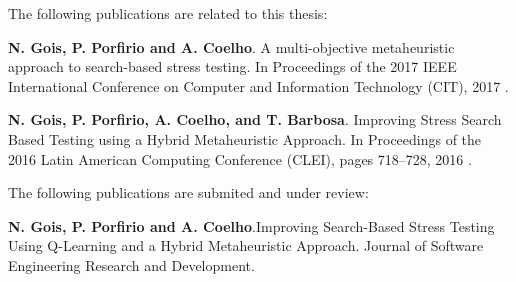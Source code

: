  

The following publications are related to this thesis:

\noindent \textbf{N. Gois, P. Porfirio and A. Coelho}. A multi-objective metaheuristic approach to search-based stress testing. In Proceedings of the 2017 IEEE International Conference on Computer and Information Technology (CIT), 2017 \cite{Gois2017}.

\noindent \textbf{N. Gois, P. Porfirio, A. Coelho, and T. Barbosa}. Improving Stress Search Based Testing using a Hybrid Metaheuristic Approach. In Proceedings of the 2016 Latin American Computing Conference (CLEI), pages 718–728, 2016 \cite{Gois2016}.


The following publications are submited and under review:

\noindent \textbf{N. Gois, P. Porfirio and A. Coelho}.Improving Search-Based Stress Testing Using Q-Learning and a Hybrid Metaheuristic Approach. Journal of Software Engineering Research and Development.